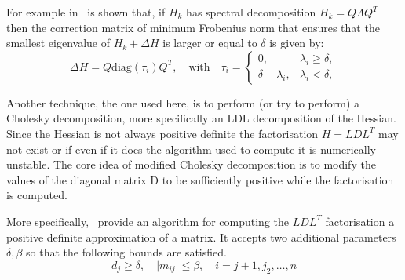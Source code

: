 \documentclass[11pt]{report}
\begin{document}
    For example in~\cite{cheng1998modified} is shown that, if $H_k$ has spectral decomposition $H_k = Q \Lambda Q^T$ then the correction matrix of minimum Frobenius norm that ensures that the smallest eigenvalue of $H_k + \Delta H$ is larger or equal to $\delta$ is given by:
    \begin{equation*}
        \Delta H = Q \text{diag}(\tau_i) Q^T, \quad \text{with} \quad \tau_i =
        \left\{
        \begin{array}{ll}
            0,                  & \lambda_i \geq \delta, \\
            \delta - \lambda_i, & \lambda_i < \delta,
        \end{array}
        \right.
    \end{equation*}

    Another technique, the one used here, is to perform (or try to perform) a Cholesky decomposition, more specifically an LDL decomposition of the Hessian.
    Since the Hessian is not always positive definite the factorisation $H = LDL^T$ may not exist or if even if it does the algorithm used to compute it is numerically unstable.
    The core idea of modified Cholesky decomposition is to modify the values of the diagonal matrix D to be sufficiently positive while the factorisation is computed.

    More specifically,~\cite{wright2006numerical} provide an algorithm for computing the $LDL^T$ factorisation a positive definite approximation of a matrix.
    It accepts two additional parameters $\delta, \beta$ so that the following bounds are satisfied.
    \begin{equation}
        d_j \geq \delta, \quad \lvert m_{ij} \rvert \leq \beta, \quad i = j+1, j_2, \dots, n
    \end{equation}
\end{document}

